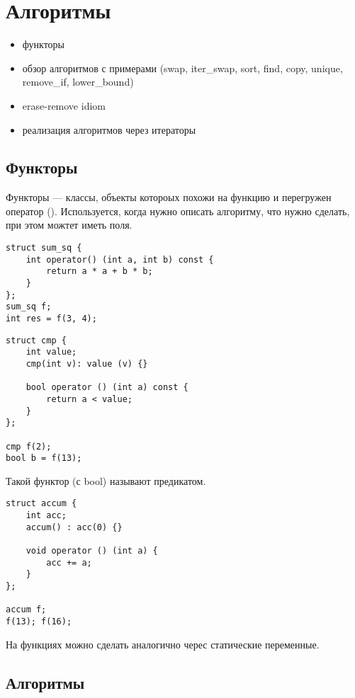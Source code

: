 \section{Алгоритмы}
\begin{itemize}[noitemsep]
	\item функторы
	\item обзор алгоритмов с примерами (swap, iter\_swap, sort, find, copy, unique, remove\_if, lower\_bound)
	\item erase-remove idiom
	\item реализация алгоритмов через итераторы
\end{itemize}
\subsection{Функторы}
Функторы --- классы, объекты котороых похожи на функцию и перегружен оператор (). Используется, когда нужно описать алгоритму, что нужно сделать, при этом можтет иметь поля.
\begin{verbatim}
struct sum_sq {
    int operator() (int a, int b) const {
	    return a * a + b * b;
	}
};
sum_sq f;
int res = f(3, 4);
\end{verbatim}
\begin{verbatim}
struct cmp {
    int value;
	cmp(int v): value (v) {}

	bool operator () (int a) const {
	    return a < value;
	}
};

cmp f(2);
bool b = f(13);
\end{verbatim}
Такой функтор (с bool) называют {\sf предикатом}.
\begin{verbatim}
struct accum {
    int acc;
	accum() : acc(0) {}

	void operator () (int a) {
	    acc += a;
	}
};

accum f;
f(13); f(16);
\end{verbatim}
На функциях можно сделать аналогично черес статические переменные.

\subsection{Алгоритмы}
